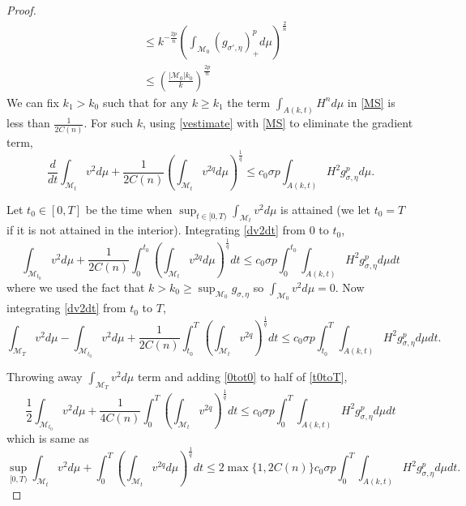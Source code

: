 \begin{proof}
\begin{align*}
            & \le k^{-\frac{2p}{n}} \left( \int_{\mathcal{M}_{0}} (g_{\sigma',\eta})_{+}^{p} d \mu\right)^{\frac{2}{n}} \\
            & \le \left( \frac{|\mathcal{M}_{0}|k_{0}}{k} \right)^{\frac{2p}{n}}
        \end{align*}
        We can fix $ k_{1} > k_{0} $ such that for any $ k \ge k_{1} $ the term $ \int_{A(k,t)}H^{n}d \mu $  in \cref{MS} is less than $ \frac{1}{2C(n)} $. For such $ k $, using \cref{vestimate} with \cref{MS} to eliminate the gradient term, 
        \begin{equation}
            \frac{d}{dt}\int_{\mathcal{M}_{t}} v^{2}d \mu + \frac{1}{2C(n)}\left( \int_{\mathcal{M}_{t}}v^{2q}d \mu \right)^{\frac{1}{q}} \le c_{0} \sigma p \int_{A(k,t)} H^{2}g_{\sigma, \eta}^{p} d \mu \label{dv2dt}.
        \end{equation}

        Let $ t_{0} \in [0,T] $ be the time when $ \sup_{t \in [0,T)} \int_{\mathcal{M}_{t}} v^{2} d \mu $ is attained (we let $ t_{0}=T $ if it is not attained in the interior). Integrating \cref{dv2dt} from $ 0 $ to $ t_{0} $, \begin{equation}
            \int_{\mathcal{M}_{t_{0}}} v^{2}d \mu+ \frac{1}{2C(n)} \int_{0}^{t_{0}} \left( \int_{\mathcal{M}_{t}}v^{2q} d \mu\right)^{\frac{1}{q}}dt \le c_{0} \sigma p \int_{0}^{t_{0}} \int_{A(k,t)}H^{2}g_{\sigma,\eta}^{p}d \mu dt \label{0tot0}
        \end{equation}
        where we used the fact that $ k>k_{0} \ge \sup_{\mathcal{M}_{0}}g_{\sigma,\eta} $ so $ \int_{\mathcal{M}_{0}}v^{2}d \mu = 0 $. Now integrating \cref{dv2dt} from $ t_{0} $ to $ T $, \begin{equation}
            \int_{\mathcal{M}_{T}}v^{2}d \mu - \int_{\mathcal{M}_{t_{0}}} v^{2}d \mu + \frac{1}{2C(n)} \int_{t_{0}}^{T} \left( \int_{\mathcal{M}_{t}}v^{2q} \right)^{\frac{1}{q}} dt \le c_{0}\sigma p \int_{t_{0}}^{T} \int_{A(k,t)} H^{2}g_{\sigma,\eta}^{p} d \mu dt \label{t0toT}.
        \end{equation}

        Throwing away $ \int_{\mathcal{M}_{T}}v^{2}d \mu $ term and adding \cref{0tot0} to half of \cref{t0toT}, \begin{equation*}
            \frac{1}{2} \int_{\mathcal{M}_{t_{0}}}v^{2}d \mu + \frac{1}{4C(n)}\int_{0}^{T}\left( \int_{\mathcal{M}_{t}}v^{2q} \right)^{\frac{1}{q}}dt \le c_{0} \sigma p \int_{0}^{T} \int_{A(k,t)}H^{2}g_{\sigma,\eta}^{p}d \mu dt
        \end{equation*}
        which is same as \begin{equation}
            \sup_{[0,T)} \int_{\mathcal{M}_{t}}v^{2}d \mu +  \int_{0}^{T} \left(\int_{\mathcal{M}_{t}} v^{2q}d \mu \right)^{\frac{1}{q}}dt \le 2\max\{1,2C(n)\}c_{0} \sigma p \int_{0}^{T}\int_{A(k,t)}H^{2}g_{\sigma,\eta}^{p}d \mu dt. \label{supineq}
        \end{equation}


\end{proof}
